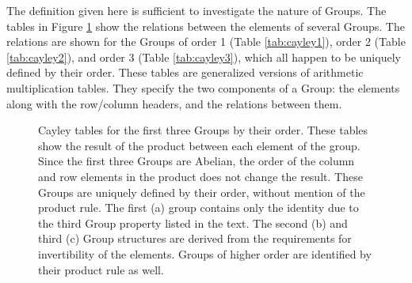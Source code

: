 The definition given here is sufficient to investigate the nature of Groups. The tables in Figure \ref{tab:cayley} show the relations between the elements of several Groups.
The relations are shown for the Groups of order 1 (Table \ref{tab:cayley1}), order 2 (Table \ref{tab:cayley2}), and order 3 (Table \ref{tab:cayley3}), which all happen to be uniquely defined by their order.
These tables are generalized versions of arithmetic multiplication tables.
They specify the two components of a Group: the elements along with the row/column headers, and the relations between them. 

\begin{figure}[h!]
\captionsetup[subfigure]{position=b}
\centering
{}
\caption{Cayley tables for the first three Groups by their order. These tables show the result of the product between each element of the group. Since the first three Groups are Abelian, the order of the column and row elements in the product does not change the result. These Groups are uniquely defined by their order, without mention of the product rule. The first (a) group contains only the identity due to the third Group property listed in the text. The second (b) and third (c) Group structures are derived from the requirements for invertibility of the elements. Groups of higher order are identified by their product rule as well.}
\label{tab:cayley}
\end{figure}

